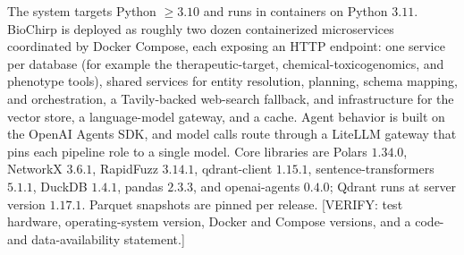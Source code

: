 The system targets Python $\geq 3.10$ and runs in containers on Python $3.11$. BioChirp is deployed as roughly two dozen containerized microservices coordinated by Docker Compose, each exposing an HTTP endpoint: one service per database (for example the therapeutic-target, chemical-toxicogenomics, and phenotype tools), shared services for entity resolution, planning, schema mapping, and orchestration, a Tavily-backed web-search fallback, and infrastructure for the vector store, a language-model gateway, and a cache. Agent behavior is built on the OpenAI Agents SDK, and model calls route through a LiteLLM gateway that pins each pipeline role to a single model. Core libraries are Polars $1.34.0$, NetworkX $3.6.1$, RapidFuzz $3.14.1$, qdrant-client $1.15.1$, sentence-transformers $5.1.1$, DuckDB $1.4.1$, pandas $2.3.3$, and openai-agents $0.4.0$; Qdrant runs at server version $1.17.1$. Parquet snapshots are pinned per release. [VERIFY: test hardware, operating-system version, Docker and Compose versions, and a code- and data-availability statement.]


